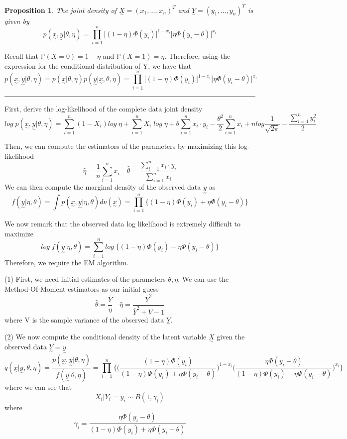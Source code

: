 \documentclass[twoside]{article}
\newtheorem{proposition}[theorem]{Proposition}
\newenvironment{proof}{{\bf Proof:}}{\hfill\rule{2mm}{2mm}}
\newcommand{\prob}{\mathbb{P}}
\newcommand{\utilde}{\underset{\sim}}
\begin{document}
\begin{proposition} The joint density of $\utilde{X} = (x_1, ..., x_n)^T$ and $\utilde{Y} = (y_1, ..., y_n)^T$ is given by 
$$
p(\utilde{x}, \utilde{y}| \theta, \eta) = \prod_{i=1}^{n}\bigg[(1 - \eta)\Phi(y_i) \bigg]^{1 - x_i}\bigg[\eta\Phi(y_i - \theta) \bigg]^{x_i}
$$
\end{proposition}

\begin{proof} Recall that $\prob(X = 0) = 1 - \eta$ and $\prob(X = 1) = \eta.$ Therefore, using the expression for the conditional distribution of Y, we have that
$$
p(\utilde{x}, \utilde{y}| \theta, \eta) = p(\utilde{x}| \theta, \eta)p(\utilde{y}| \utilde{x}, \theta, \eta) = \prod_{i=1}^{n}\bigg[(1 - \eta)\Phi(y_i) \bigg]^{1 - x_i}\bigg[\eta\Phi(y_i - \theta) \bigg]^{x_i}
$$
\end{proof}

First, derive the log-likelihood of the complete data joint density 
$$
log\; p(\utilde{x},\utilde{y}|\theta, \eta) = \sum_{i=1}^{n}(1 - X_i)log\;\eta + \sum_{i=1}^{n}X_i\;log\;\eta + \theta \sum_{i=1}^{n}x_i\cdot y_i - \frac{\theta^2}{2}\sum_{i=1}^{n}x_i + nlog\frac{1}{\sqrt{2\pi}} - \frac{\sum_{i=1}^{n}y_i^2}{2}
$$

Then, we can compute the estimators of the parameters by maximizing this log-likelihood
$$
\hat{\eta} = \frac{1}{n}\sum_{i=1}^{n}x_i \quad \hat{\theta} = \frac{\sum_{i=1}^{n}x_i \cdot y_i}{\sum_{i=1}^{n}x_i}
$$
We can then compute the marginal density of the observed data $\utilde{y}$ as 
$$
f(\utilde{y}|\eta, \theta) = \int p(\utilde{x}, \utilde{y}| \eta, \theta)d\nu(\utilde{x}) = \prod_{i=1}^{n}\bigg\{(1 - \eta)\Phi(y_i) + \eta \Phi(y_i - \theta) \bigg\}
$$


We now remark that the observed data log likelihood is extremely difficult to maximize
$$
log\;f(\utilde{y}|\eta, \theta) = \sum_{i=1}^{n}log\;\bigg\{(1 - \eta)\Phi(y_i) - \eta \Phi(y_i - \theta) \bigg\}
$$
Therefore, we require the EM algorithm.

(1) First, we need initial estimates of the parameters $\theta, \eta.$ We can use the Method-Of-Moment estimators as our initial guess 
$$
\hat{\theta} = \frac{\overline{Y}}{\eta}  \quad \hat{\eta} = \frac{\overline{Y}^2}{\overline{Y}^2 + V - 1}
$$
where V is the sample variance of the observed data $\utilde{Y}.$

(2) We now compute the conditional density of the latent variable $\utilde{X}$ given the observed data $\utilde{Y} = \utilde{y}$
$$
q(\utilde{x}|\utilde{y}, \theta, \eta) = \frac{p(\utilde{x}, \utilde{y}| \theta, \eta)}{f(\utilde{y}| \theta, \eta)} = \prod_{i=1}^{n}\bigg\{ \bigg(\frac{(1 - \eta)\Phi(y_i)}{(1 - \eta)\Phi(y_i) + \eta \Phi(y_i - \theta)} \bigg)^{1 - x_{i}} \bigg(\frac{\eta \Phi(y_i - \theta)}{(1 - \eta)\Phi(y_i) + \eta \Phi(y_i - \theta)} \bigg)^{x_{i}} \bigg\}
$$
where we can see that 
$$
X_i|Y_i = y_i \sim B(1, \gamma_i)
$$
where 
$$
\gamma_i = \frac{\eta \Phi(y_i - \theta)}{(1 - \eta)\Phi(y_i) + \eta \Phi(y_i - \theta)}
$$
\end{document}
